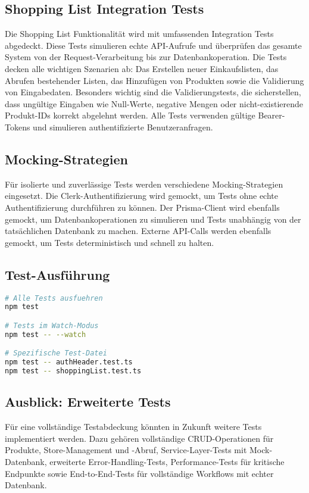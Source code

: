 \subsection{Shopping List Integration Tests}

Die Shopping List Funktionalität wird mit umfassenden Integration Tests abgedeckt. Diese Tests simulieren echte API-Aufrufe und überprüfen das gesamte System von der Request-Verarbeitung bis zur Datenbankoperation. Die Tests decken alle wichtigen Szenarien ab: Das Erstellen neuer Einkaufslisten, das Abrufen bestehender Listen, das Hinzufügen von Produkten sowie die Validierung von Eingabedaten. Besonders wichtig sind die Validierungstests, die sicherstellen, dass ungültige Eingaben wie Null-Werte, negative Mengen oder nicht-existierende Produkt-IDs korrekt abgelehnt werden. Alle Tests verwenden gültige Bearer-Tokens und simulieren authentifizierte Benutzeranfragen.

\subsection{Mocking-Strategien}

Für isolierte und zuverlässige Tests werden verschiedene Mocking-Strategien eingesetzt. Die Clerk-Authentifizierung wird gemockt, um Tests ohne echte Authentifizierung durchführen zu können. Der Prisma-Client wird ebenfalls gemockt, um Datenbankoperationen zu simulieren und Tests unabhängig von der tatsächlichen Datenbank zu machen. Externe API-Calls werden ebenfalls gemockt, um Tests deterministisch und schnell zu halten.

\subsection{Test-Ausführung}

\begin{lstlisting}[language=bash,caption={Test-Befehle}]
# Alle Tests ausfuehren
npm test

# Tests im Watch-Modus
npm test -- --watch

# Spezifische Test-Datei
npm test -- authHeader.test.ts
npm test -- shoppingList.test.ts
\end{lstlisting}

\subsection{Ausblick: Erweiterte Tests}

Für eine vollständige Testabdeckung könnten in Zukunft weitere Tests implementiert werden. Dazu gehören vollständige CRUD-Operationen für Produkte, Store-Management und -Abruf, Service-Layer-Tests mit Mock-Datenbank, erweiterte Error-Handling-Tests, Performance-Tests für kritische Endpunkte sowie End-to-End-Tests für vollständige Workflows mit echter Datenbank.

